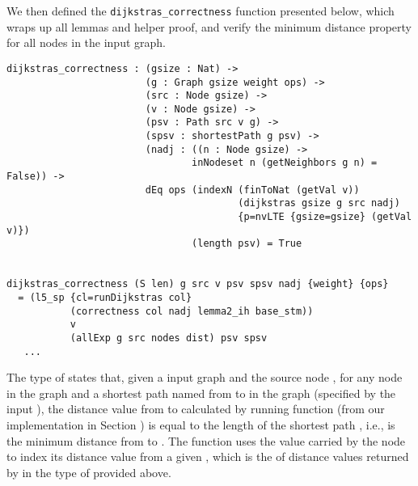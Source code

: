 We then defined the \texttt{dijkstras\_correctness} function presented below, which wraps up all lemmas and helper proof, and verify the minimum distance property for all nodes in the input graph. 
\\
\begin{lstlisting}
dijkstras_correctness : (gsize : Nat) ->
                        (g : Graph gsize weight ops) ->
                        (src : Node gsize) ->
                        (v : Node gsize) ->
                        (psv : Path src v g) ->
                        (spsv : shortestPath g psv) ->
                        (nadj : ((n : Node gsize) -> 
                        		inNodeset n (getNeighbors g n) = False)) ->
                        dEq ops (indexN (finToNat (getVal v)) 
                        				(dijkstras gsize g src nadj) 
                        				{p=nvLTE {gsize=gsize} (getVal v)}) 
                        		(length psv) = True
 

dijkstras_correctness (S len) g src v psv spsv nadj {weight} {ops}
  = (l5_sp {cl=runDijkstras col} 
           (correctness col nadj lemma2_ih base_stm)) 
           v 
           (allExp g src nodes dist) psv spsv
   ...
\end{lstlisting}


The type of  states that, given a input graph  and the source node , for any node  in the graph and a shortest path named  from  to  in the graph (specified by the input ), the distance value from  to  calculated by running  function (from our implementation in Section ) is equal to the length of the shortest path , i.e., is the minimum distance from  to . The function  uses the value carried by the node  to index its distance value from a given , which is the  of distance values returned by  in the type of  provided above. 
\\

